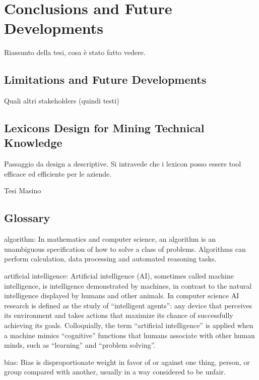 \documentclass[]{book}
\begin{document}
\part{Conclusions and Future
Developments}\label{part-conclusions-and-future-developments}

Riassunto della tesi, cosa è stato fatto vedere.

\chapter{Limitations and Future
Developments}\label{limitations-and-future-developments}

Quali altri stakeholders (quindi testi)

\chapter{Lexicons Design for Mining Technical
Knowledge}\label{sotadocumentsunderstandlexicons}

Passaggio da design a descriptive. Si intravede che i lexicon posso
essere tool efficace ed efficiente per le aziende.

Tesi Masino

\chapter*{Glossary}\label{glossary}

algorithm: In mathematics and computer science, an algorithm is an
unambiguous specification of how to solve a class of problems.
Algorithms can perform calculation, data processing and automated
reasoning tasks.

artificial intelligence: Artificial intelligence (AI), sometimes called
machine intelligence, is intelligence demonstrated by machines, in
contrast to the natural intelligence displayed by humans and other
animals. In computer science AI research is defined as the study of
``intelligent agents'': any device that perceives its environment and
takes actions that maximize its chance of successfully achieving its
goals. Colloquially, the term ``artificial intelligence'' is applied
when a machine mimics ``cognitive'' functions that humans associate with
other human minds, such as ``learning'' and ``problem solving''.

bias: Bias is disproportionate weight in favor of or against one thing,
person, or group compared with another, usually in a way considered to
be unfair.
\end{document}
